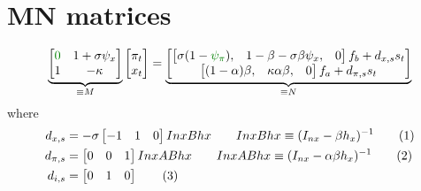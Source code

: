 \documentclass[11pt]{article}
\renewcommand{\[}{\begin{equation}}
\renewcommand{\]}{\end{equation}}
\newcommand\numberthis{\addtocounter{equation}{1}\tag{\theequation}} %
\begin{document}
\section{MN matrices}
\begin{equation}
\underbrace{\begin{bmatrix} \textcolor{mygreen}{0}&  1+\sigma\psi_x\\ 1& -\kappa \end{bmatrix}}_{\equiv M}\begin{bmatrix} \pi_t \\ x_t \end{bmatrix} = \underbrace{\begin{bmatrix} \begin{bmatrix} \sigma(1-\textcolor{mygreen}{\psi_{\pi}}), &1-\beta-\sigma\beta\psi_x ,&0 \end{bmatrix}f_b +d_{x,s} s_t \\ \begin{bmatrix} (1-\alpha)\beta, &\kappa\alpha\beta ,& 0 \end{bmatrix} f_a +d_{\pi,s} s_t \end{bmatrix}}_{\equiv N}
\end{equation}
where 
\begin{align*}
 d_{x,s} & =  -\sigma\begin{bmatrix} -1 &1 & 0 \end{bmatrix}InxBhx \quad \quad InxBhx \equiv (I_{nx}-\beta h_x)^{-1} \numberthis \\
 d_{\pi,s} & =  \begin{bmatrix} 0&0 & 1  \end{bmatrix}InxABhx \quad \quad InxABhx \equiv (I_{nx}-\alpha\beta h_x)^{-1} \numberthis \\
  d_{i,s} & =  \begin{bmatrix} 0 &1 & 0  \end{bmatrix} \numberthis
\end{align*}
\end{document}
